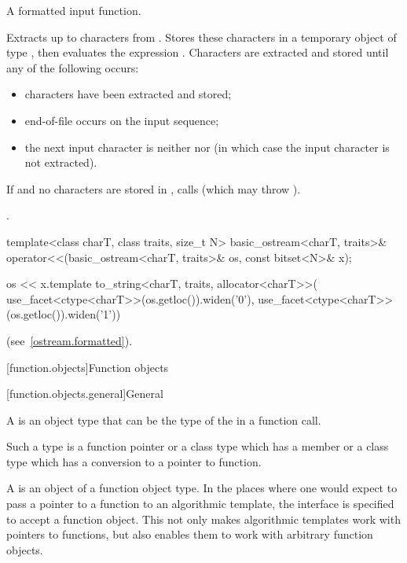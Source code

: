 \begin{itemdescr}
\pnum
A formatted input function.

\pnum
\effects
Extracts up to  characters from .
Stores these characters in a temporary object  of type
,
then evaluates the expression
.
Characters are extracted and stored until any of the following occurs:
\begin{itemize}
\item
{} characters have been extracted and stored;
\item
{}%
end-of-file occurs on the input sequence;
\item
the next input character is neither
nor
(in which case the input character is not extracted).
\end{itemize}

\pnum
If  and no characters are stored in , calls
(which may throw
).

\pnum
\returns
{}.
\end{itemdescr}

%
\begin{itemdecl}
template<class charT, class traits, size_t N>
  basic_ostream<charT, traits>&
    operator<<(basic_ostream<charT, traits>& os, const bitset<N>& x);
\end{itemdecl}

\begin{itemdescr}
\pnum
\returns
\begin{codeblock}
os << x.template to_string<charT, traits, allocator<charT>>(
  use_facet<ctype<charT>>(os.getloc()).widen('0'),
  use_facet<ctype<charT>>(os.getloc()).widen('1'))
\end{codeblock}
(see~\ref{ostream.formatted}).
\end{itemdescr}

[function.objects]{Function objects}

[function.objects.general]{General}

\pnum
A  is an object
type that can be the type of the
in a function call.
\begin{footnote}
Such a type is a function
pointer or a class type which has a member  or a class type
which has a conversion to a pointer to function.
\end{footnote}
A  is an
object of a function object type. In the places where one would expect to pass a
pointer to a function to an algorithmic template, the
interface is specified to accept a function object. This not only makes
algorithmic templates work with pointers to functions, but also enables them to
work with arbitrary function objects.

